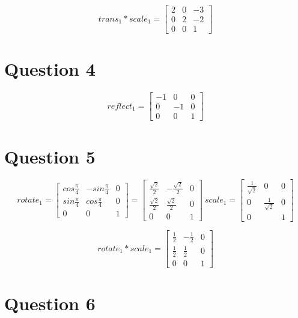 \documentclass[10pt]{article}
\begin{document}
\[
  trans_1 * scale_1 =
  \begin{bmatrix}
    2 & 0 & -3 \\
    0 & 2 & -2 \\
    0 & 0 &  1
  \end{bmatrix}
\]

\section*{Question 4}

\[
  reflect_1 =
  \begin{bmatrix}
    -1 &  0 & 0 \\
     0 & -1 & 0 \\
     0 &  0 & 1
  \end{bmatrix}
\]

\section*{Question 5}

\[
  rotate_1 =
  \begin{bmatrix}
    cos \frac{\pi}{4} & -sin \frac{\pi}{4} & 0 \\
    sin \frac{\pi}{4} &  cos \frac{\pi}{4} & 0 \\
    0                 &  0                 & 1
  \end{bmatrix}
  =
  \begin{bmatrix}
    \frac{\sqrt{2}}{2} & -\frac{\sqrt{2}}{2} & 0 \\
    \frac{\sqrt{2}}{2} &  \frac{\sqrt{2}}{2} & 0 \\
    0                  &  0                  & 1
  \end{bmatrix}
  \ scale_1 =
  \begin{bmatrix}
    \frac{1}{\sqrt{2}} & 0                  & 0 \\
    0                  & \frac{1}{\sqrt{2}} & 0 \\
    0                  &                    & 1
  \end{bmatrix}
\]

\[
  rotate_1 * scale_1 =
  \begin{bmatrix}
    \frac{1}{2} & -\frac{1}{2} & 0 \\
    \frac{1}{2} &  \frac{1}{2} & 0 \\
    0           &  0           & 1
  \end{bmatrix}
\]

\section*{Question 6}
\end{document}
